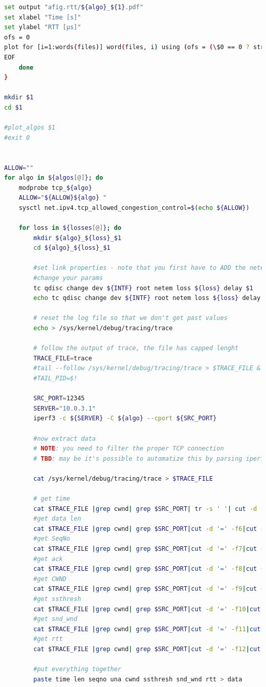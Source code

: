 \documentclass{exam}
\begin{document}
\begin{lstlisting}[language=bash]
set output "afig.rtt/${algo}_${1}.pdf"
set xlabel "Time [s]"
set ylabel "RTT [µs]"
ofs = 0
plot for [i=1:words(files)] word(files, i) using (ofs = (\$0 == 0 ? strcol(1) : ofs), strcol(1) - ofs):8 title word(titles, i) with linespoint
EOF
	done
}

mkdir $1
cd $1

#plot_algos $1
#exit 0


ALLOW=""
for algo in ${algos[@]}; do
	modprobe tcp_${algo}
	ALLOW="${ALLOW}${algo} "
	sysctl net.ipv4.tcp_allowed_congestion_control=$(echo ${ALLOW})

	for loss in ${losses[@]}; do
		mkdir ${algo}_${loss}_$1
		cd ${algo}_${loss}_$1

		#set link properties - note that you first have to ADD the netem qdisc before CHANGE it
		#change your params
		tc qdisc change dev ${INTF} root netem loss ${loss} delay $1
		echo tc qdisc change dev ${INTF} root netem loss ${loss} delay $1

		# reset the log file so that we don't get past values
		echo > /sys/kernel/debug/tracing/trace

		# follow the output of trace, the file has capped lenght
		TRACE_FILE=trace
		#tail --follow /sys/kernel/debug/tracing/trace > $TRACE_FILE &
		#TAIL_PID=$!

		SRC_PORT=12345
		SERVER="10.0.3.1"
		iperf3 -c ${SERVER} -C ${algo} --cport ${SRC_PORT}

		#now extract data
		# NOTE: you need to filter the proper TCP connection
		# TBD: may be it's possible to automatize this by parsing iperf3 output?

		cat /sys/kernel/debug/tracing/trace > $TRACE_FILE

		# get time
		cat $TRACE_FILE |grep cwnd| grep $SRC_PORT| tr -s ' '| cut -d ' ' -f 5|cut -d':' -f 1 >time
		#get data len
		cat $TRACE_FILE |grep cwnd| grep $SRC_PORT|cut -d '=' -f6|cut -d ' ' -f 1 >len
		#get SeqNo
		cat $TRACE_FILE |grep cwnd| grep $SRC_PORT|cut -d '=' -f7|cut -d ' ' -f 1 >seqno
		#get ack
		cat $TRACE_FILE |grep cwnd| grep $SRC_PORT|cut -d '=' -f8|cut -d ' ' -f 1 >una
		#get CWND
		cat $TRACE_FILE |grep cwnd| grep $SRC_PORT|cut -d '=' -f9|cut -d ' ' -f 1 >cwnd
		#get ssthresh
		cat $TRACE_FILE |grep cwnd| grep $SRC_PORT|cut -d '=' -f10|cut -d ' ' -f 1 >ssthresh
		#get snd_wnd
		cat $TRACE_FILE |grep cwnd| grep $SRC_PORT|cut -d '=' -f11|cut -d ' ' -f 1 >snd_wnd
		#get rtt
		cat $TRACE_FILE |grep cwnd| grep $SRC_PORT|cut -d '=' -f12|cut -d ' ' -f 1 >rtt
			
		#put everything together	
		paste time len seqno una cwnd ssthresh snd_wnd rtt > data



\end{lstlisting}
\end{document}
